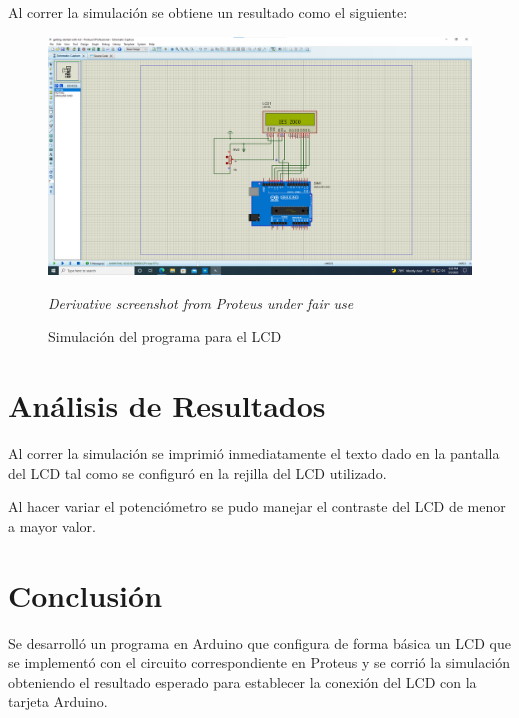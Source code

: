 \documentclass{article}
\begin{document}
    \bigbreak

    Al correr la simulación se obtiene un resultado como el siguiente:

    \begin{figure}[H]
        \centering
        \includegraphics[width=0.6\paperwidth]{images/sim-running.png}
        \caption{Simulación del programa para el LCD}\footnotesize
        \textit{Derivative screenshot from Proteus under fair use}
    \end{figure}

    \section{Análisis de Resultados}

    Al correr la simulación se imprimió inmediatamente el texto dado en la
    pantalla del LCD tal como se configuró en la rejilla del LCD utilizado.

    \bigbreak

    Al hacer variar el potenciómetro se pudo manejar el contraste del LCD de
    menor a mayor valor.

    \section{Conclusión}

    Se desarrolló un programa en Arduino que configura de forma básica un LCD
    que se implementó con el circuito correspondiente en Proteus y se corrió
    la simulación obteniendo el resultado esperado para establecer la
    conexión del LCD con la tarjeta Arduino.

    \printbibliography
\end{document}
